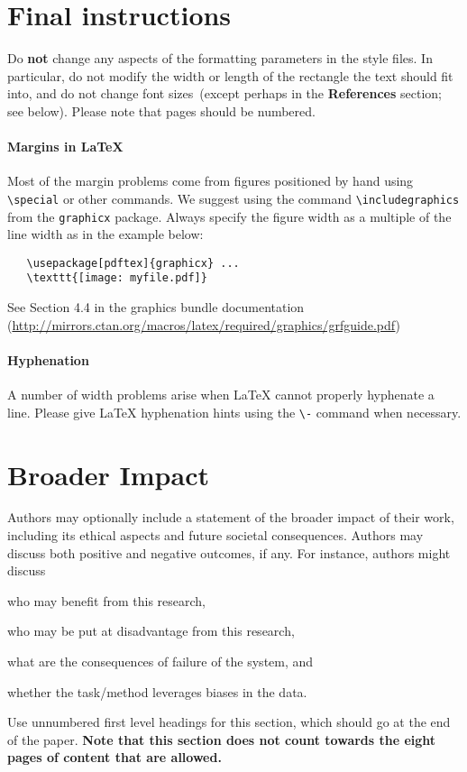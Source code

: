 \documentclass{article}
\begin{document}
\section{Final instructions}

Do \textbf{not} change any aspects of the formatting parameters in the style files.  In
particular, do not modify the width or length of the rectangle the text should
fit into, and do not change font sizes~(except perhaps in the
\textbf{References} section; see below). Please note that pages should be
numbered.

\paragraph{Margins in \LaTeX{}}

Most of the margin problems come from figures positioned by hand using
\verb+\special+ or other commands. We suggest using the command
\verb+\includegraphics+ from the \verb+graphicx+ package. Always specify the
figure width as a multiple of the line width as in the example below:
\begin{verbatim}
   \usepackage[pdftex]{graphicx} ...
   \texttt{[image: myfile.pdf]}
\end{verbatim}
See Section 4.4 in the graphics bundle documentation
(\url{http://mirrors.ctan.org/macros/latex/required/graphics/grfguide.pdf})

\paragraph{Hyphenation}
%
A number of width problems arise when \LaTeX{} cannot properly hyphenate a
line. Please give LaTeX hyphenation hints using the \verb+\-+ command when
necessary.

\section*{Broader Impact}

Authors may optionally include a statement of the broader impact of
their work, including its ethical aspects and future societal
consequences.  Authors may discuss both positive and negative
outcomes, if any. For instance, authors might discuss
%
\begin{inparaenum}[(i)]
  \item who may benefit from this research,
  \item who may be put at disadvantage from this research,
  \item what are the consequences of failure of the system, and
  \item whether the task/method leverages biases in the data.
\end{inparaenum}
%
Use unnumbered first level headings for this section, which should go at
the end of the paper. \textbf{Note that this section does not count towards
the eight pages of content that are allowed.}
\end{document}
